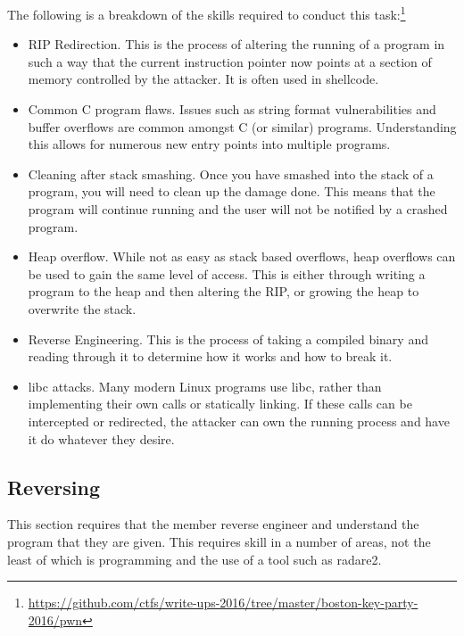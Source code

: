 \documentclass[a4paper,11pt]{report}
\begin{document}
			The following is a breakdown of the skills required to conduct this task:\footnote{\url{https://github.com/ctfs/write-ups-2016/tree/master/boston-key-party-2016/pwn}}
			\begin{itemize}
				\item RIP Redirection. 
					This is the process of altering the running of a program in such a way that the current instruction pointer now points at a section of memory controlled by the attacker. 
					It is often used in shellcode. 
				\item Common C program flaws. 
					Issues such as string format vulnerabilities and buffer overflows are common amongst C (or similar) programs. 
					Understanding this allows for numerous new entry points into multiple programs. 
				\item Cleaning after stack smashing. 
					Once you have smashed into the stack of a program, you will need to clean up the damage done. 
					This means that the program will continue running and the user will not be notified by a crashed program. 
				\item Heap overflow. 
					While not as easy as stack based overflows, heap overflows can be used to gain the same level of access. 
					This is either through writing a program to the heap and then altering the RIP, or growing the heap to overwrite the stack. 
				\item Reverse Engineering.
					This is the process of taking a compiled binary and reading through it to determine how it works and how to break it. 
				\item libc attacks. 
					Many modern Linux programs use libc, rather than implementing their own calls or statically linking. 
					If these calls can be intercepted or redirected, the attacker can own the running process and have it do whatever they desire. 
			\end{itemize}
		\subsection{Reversing}
			This section requires that the member reverse engineer and understand the program that they are given. 
			This requires skill in a number of areas, not the least of which is programming and the use of a tool such as radare2. 
\end{document}
